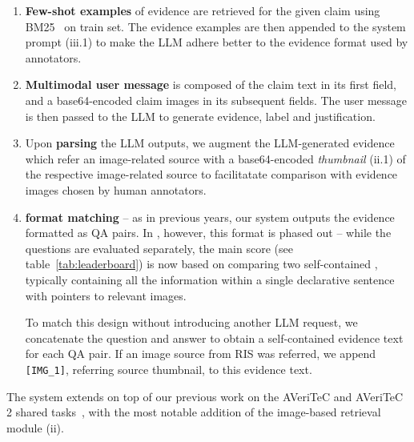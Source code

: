\begin{enumerate}[label=\roman*.]
\begin{enumerate}[label=\arabic*.]
    These sources, as well as the task description, formatting instructions and few-shot examples (iii.2) are then serialized into a single system prompt -- its full text can be found in Appendix~\ref{appendix_sec:system2026_prompt}
    \item \textbf{Few-shot examples} of evidence are retrieved for the given claim using BM25~\cite{bm25} on \averitec{} train set. The evidence examples are then appended to the system prompt (iii.1) to make the LLM adhere better to the evidence format used by \averitec{} annotators.
    \item \textbf{Multimodal user message} is composed of the claim text in its first field, and a base64-encoded claim images in its subsequent fields.
    The user message is then passed to the LLM to generate evidence, label and justification.
    \item Upon \textbf{parsing} the LLM outputs, we augment the LLM-generated evidence which refer an image-related source with a base64-encoded \textit{thumbnail} (ii.1) of the respective image-related source to facilitatate comparison with evidence images chosen by human annotators. 
    \item \textbf{\averitec{} format matching} -- as in previous years, our system outputs the evidence formatted as QA pairs. In \averitec{}, however, this format is phased out -- while the questions are evaluated separately, the main score (see table~\ref{tab:leaderboard}) is now based on comparing two self-contained , typically containing all the information within a single declarative sentence with pointers to relevant images.

    To match this design without introducing another LLM request, we concatenate the question and answer to obtain a self-contained evidence text for each QA pair. If an image source from RIS was referred, we append \texttt{[IMG\_1]}, referring source thumbnail, to this evidence text.
\end{enumerate}
\end{enumerate}

The system extends on top of our previous work on the AVeriTeC and AVeriTeC 2 shared tasks~\cite{ullrich-etal-2024-aic,ullrich-drchal-2025-aic}, with the most notable addition of the image-based retrieval module (ii).

